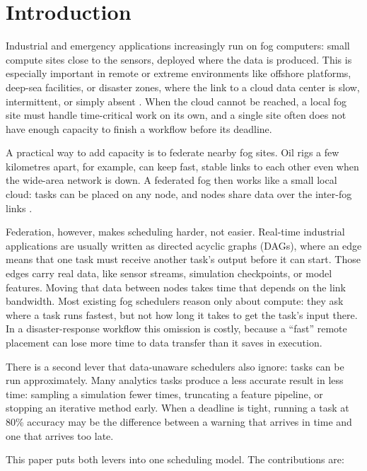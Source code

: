 \documentclass[conference]{IEEEtran}
\begin{document}
\section{Introduction}

Industrial and emergency applications increasingly run on fog computers: small compute sites close to the sensors, deployed where the data is produced. This is especially important in remote or extreme environments like offshore platforms, deep-sea facilities, or disaster zones, where the link to a cloud data center is slow, intermittent, or simply absent \cite{rehman2018,cai2019}. When the cloud cannot be reached, a local fog site must handle time-critical work on its own, and a single site often does not have enough capacity to finish a workflow before its deadline.

A practical way to add capacity is to federate nearby fog sites. Oil rigs a few kilometres apart, for example, can keep fast, stable links to each other even when the wide-area network is down. A federated fog then works like a small local cloud: tasks can be placed on any node, and nodes share data over the inter-fog links \cite{fgcs2024,hong2019survey}.

Federation, however, makes scheduling harder, not easier. Real-time industrial applications are usually written as directed acyclic graphs (DAGs), where an edge means that one task must receive another task's output before it can start. Those edges carry real data, like sensor streams, simulation checkpoints, or model features. Moving that data between nodes takes time that depends on the link bandwidth. Most existing fog schedulers reason only about compute: they ask where a task runs fastest, but not how long it takes to get the task's input there. In a disaster-response workflow this omission is costly, because a ``fast'' remote placement can lose more time to data transfer than it saves in execution.

There is a second lever that data-unaware schedulers also ignore: tasks can be run approximately. Many analytics tasks produce a less accurate result in less time: sampling a simulation fewer times, truncating a feature pipeline, or stopping an iterative method early. When a deadline is tight, running a task at 80\% accuracy may be the difference between a warning that arrives in time and one that arrives too late.

This paper puts both levers into one scheduling model. The contributions are:
\end{document}

